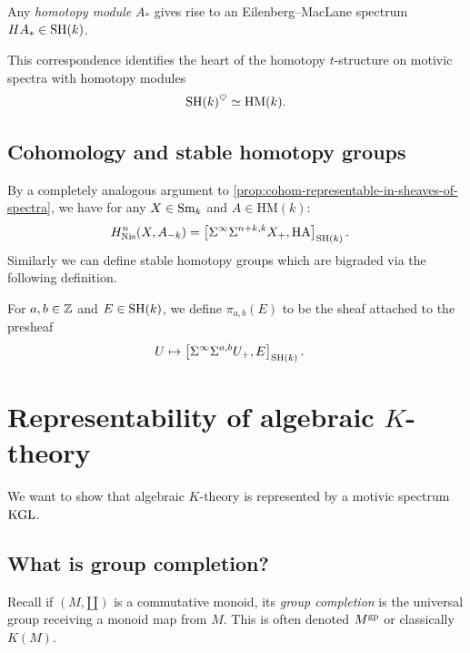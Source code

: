 \documentclass[11pt,openany]{book}
\providecommand{\HM}{\mathrm{HM}}
\providecommand{\HA}{\mathrm{HA}}
\begin{document}
\begin{proposition} Any \textit{homotopy module} $A_\ast$ gives rise to an Eilenberg--MacLane spectrum $HA_\ast \in \mathrm{SH}(k)$.
\end{proposition}

This correspondence identifies the heart of the homotopy $t$-structure on motivic spectra with homotopy modules
\begin{align*}
    \SH(k)^\heart \simeq \HM(k).
\end{align*}
%

\subsection{Cohomology and stable homotopy groups}

By a completely analogous argument to \autoref{prop:cohom-representable-in-sheaves-of-spectra}, we have for any $X\in \mathrm{Sm}_k$ and $A \in \HM(k)$:
\begin{align*}
    H^n_\Nis(X, A_{-k}) &= \left[ \Sigma^\infty \Sigma^{n+k,k}X_+, \HA \right]_{\SH(k)}.
\end{align*}
%
Similarly we can define stable homotopy groups which are bigraded via the following definition.

\begin{definition} For $a,b\in \mathbb{Z}$ and $E \in \mathrm{SH}(k)$, we define $\pi_{a,b}(E)$ to be the sheaf attached to the presheaf
\begin{align*}
    U &\mapsto \left[ \Sigma^\infty \Sigma^{a,b} U_+, E \right]_{\mathrm{SH}(k)}.
\end{align*}
\end{definition}

\section{Representability of algebraic $K$-theory}

\begin{goal} We want to show that algebraic $K$-theory is represented by a motivic spectrum $\mathrm{KGL}$.
\end{goal}

\subsection{What is group completion?}

Recall if $(M,\amalg)$ is a commutative monoid, its \textit{group completion} is the universal group receiving a monoid map from $M$. This is often denoted $M^{\mathrm{gp}}$ or classically $K(M)$.
\end{document}
